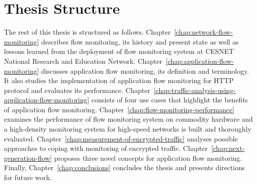 \section{Thesis Structure}

The rest of this thesis is structured as follows. Chapter~\ref{chap:network-flow-monitoring} describes flow monitoring, its history and present state as well as lessons learned from the deployment of flow monitoring system at CESNET National Research and Education Network. Chapter~\ref{chap:application-flow-monitoring} discusses application flow monitoring, its definition and terminology.  It also studies the implementation of application flow monitoring for HTTP protocol and evaluates its performance. Chapter~\ref{chap:traffic-analysis-using-application-flow-monitoring} consists of four use cases that highlight the benefits of application flow monitoring. Chapter~\ref{chap:flow-monitoring-performance} examines the performance of flow monitoring system on commodity hardware and a high-density monitoring system for high-speed networks is built and thoroughly evaluated. Chapter~\ref{chap:measurement-of-encrypted-traffic} analyses possible approaches to coping with monitoring of encrypted traffic. Chapter~\ref{chap:next-generation-flow} proposes three novel concepts for application flow monitoring. Finally, Chapter~\ref{chap:conclusions} concludes the thesis and presents directions for future work.
